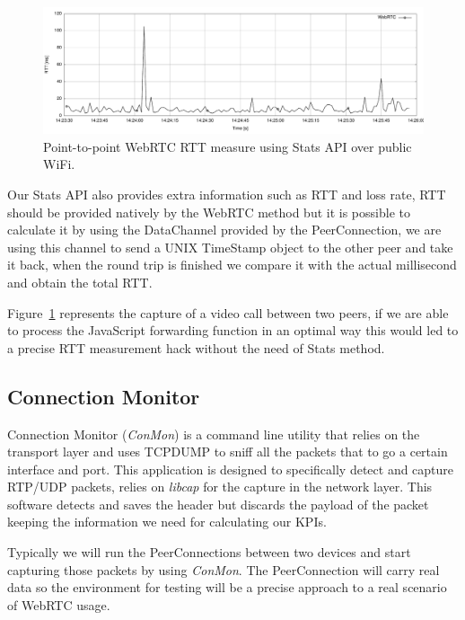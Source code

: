  \begin{figure}[h]
  \centering
    \includegraphics[width=1\textwidth]{./figures/p2prttexample.pdf}
      \caption[Point-to-point WebRTC RTT measure using Stats API over public WiFi]{Point-to-point WebRTC RTT measure using Stats API over public WiFi.}
	\label{fig:p2prttexample}
\end{figure}

Our Stats API also provides extra information such as RTT and loss rate, RTT should be provided natively by the WebRTC method but it is possible to calculate it by using the DataChannel provided by the PeerConnection, we are using this channel to send a UNIX TimeStamp object to the other peer and take it back, when the round trip is finished we compare it with the actual millisecond and obtain the total RTT.

Figure~\ref{fig:p2prttexample} represents the capture of a video call between two peers, if we are able to process the JavaScript forwarding function in an optimal way this would led to a precise RTT measurement hack without the need of Stats method.

\subsection{Connection Monitor}

Connection Monitor ({\it ConMon}) is a command line utility that relies on the transport layer and uses TCPDUMP to sniff all the packets that to go a certain interface and port. This application is designed to specifically detect and capture RTP/UDP packets, relies on {\it libcap} for the capture in the network layer. This software detects and saves the header but discards the payload of the packet keeping the information we need for calculating our KPIs.

Typically we will run the PeerConnections between two devices and start capturing those packets by using {\it ConMon}. The PeerConnection will carry real data so the environment for testing will be a precise approach to a real scenario of WebRTC usage.


